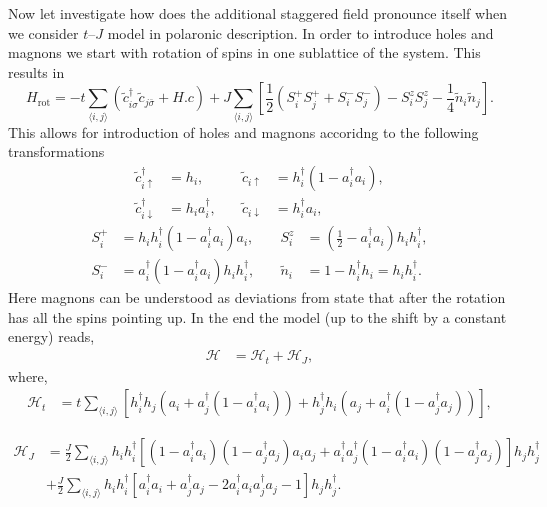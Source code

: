 \documentclass[%
 reprint,
 amsmath,amssymb,
 aps, onecolumn,
prl,
]{revtex4-1}
\newcommand{\mean}[1]{\langle#1\rangle}
\begin{document}
Now let investigate how does the additional staggered field pronounce itself when we consider $t$--$J$ model in polaronic description. In order to introduce holes and magnons we start with rotation of spins in one sublattice of the system. This results in
\begin{equation}
	H_{\text{rot}} = -t\sum_{\mean{i,j}}\left(\tilde{c}_{i\sigma}^\dagger\tilde{c}_{j\bar{\sigma}} + H.c\right)
	+ J\sum_{\mean{i,j}}\left[\frac{1}{2}\left(S_i^+S_j^+ + S_i^-S_j^-\right) - S_i^zS_j^z - \frac{1}{4}\tilde{n}_i\tilde{n}_j\right].
\end{equation}
This allows for introduction of holes and magnons accoridng to the following transformations
\begin{equation}
	\begin{aligned}
	\tilde{c}_{i\uparrow}^\dag &= h_i, &\quad \tilde{c}_{i\uparrow} &= h_i^\dag (1 - a_i^\dag a_i), \\
	\tilde{c}_{i\downarrow}^\dag &= h_i a_i^\dag, &\quad \tilde{c}_{i\downarrow} &= h_i^\dag a_i,
	\end{aligned}
\end{equation}
\begin{equation}
	\begin{aligned}
		S_i^+ &= h_i h_i^\dag (1 - a_i^\dag a_i)a_i, &\quad S_i^z &= \left(\frac{1}{2} - a_i^\dag a_i \right) h_i h_i^\dag, \\
		S_i^- &= a_i^\dag (1 - a_i^\dag a_i) h_i h_i^\dag, &\quad \tilde{n}_i &= 1 - h_i^\dag h_i = h_i h_i^\dag.
	\end{aligned}
\end{equation}
Here magnons can be understood as deviations from state that after the rotation has all the spins pointing up. In the end the model (up to the shift by a constant energy) reads,
\begin{align}
	\mathcal{H} &= \mathcal{H}_{t} + \mathcal{H}_{J},
\end{align}
	where,
\begin{equation}
	\begin{split}
	\mathcal{H}_{t} &= t \sum_{\mean{i,j}} \left[h_i^\dag h_j \left( a_i + a_j^\dag (1 -  a_i^\dag a_i) \right) + h_j^\dag h_i \left( a_j + a_i^\dag (1 -  a_j^\dag a_j) \right)\right],
	\end{split}
	\label{eq:ht}
\end{equation}

\begin{equation}
	\begin{aligned}
	\mathcal{H}_{J} &= \frac{J}{2}\sum_{\mean{i,j}} h_i h_i^\dag \left[(1 - a_i^\dag a_i)(1 - a_j^\dag a_j)a_i a_j + a_i^\dag a_j^\dag (1 - a_i^\dag a_i)(1 - a_j^\dag a_j) \right] h_j h_j^\dag \\
	&+ \frac{J}{2} \sum_{\mean{i,j}} h_i h_i^\dag \left[a_i^\dag a_i + a_j^\dag a_j - 2 a_i^\dag a_i a_j^\dag a_j - 1\right] h_j h_j^\dag.
	\end{aligned}
	\label{eq:hj}
\end{equation}
\end{document}
